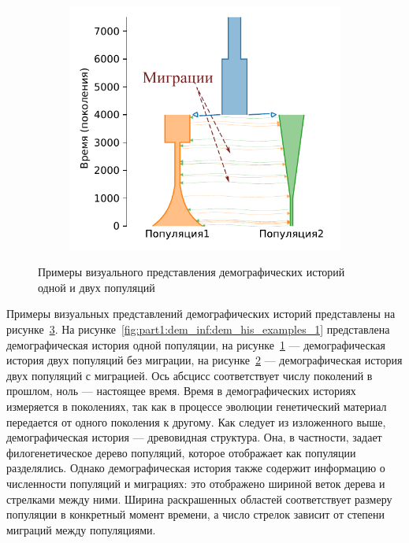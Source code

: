 \documentclass[a4paper,14pt,oneside,openany,article]{memoir}
\begin{document}
\begin{figure}[h]
\begin{subfigure}[b]{.33\textwidth}
    \caption{}
    \label{fig:part1:dem_inf:dem_his_examples_2}
    \end{subfigure}%
    \begin{subfigure}[b]{.33\textwidth}
    \includegraphics[width=\textwidth]{images/part1/dem_history/2d_model_migration_fixed.pdf}
    \caption{}
    \label{fig:part1:dem_inf:dem_his_examples_3}
    \end{subfigure}
    \caption{Примеры визуального представления демографических историй одной и двух популяций}
    \label{fig:part1:dem_inf:dem_his_examples}
\end{figure}

Примеры визуальных представлений демографических историй представлены на рисунке~\ref{fig:part1:dem_inf:dem_his_examples}. 
На рисунке~\ref{fig:part1:dem_inf:dem_his_examples_1} представлена демографическая история одной популяции, на рисунке~\ref{fig:part1:dem_inf:dem_his_examples_2}  --- демографическая история двух популяций без миграции, на рисунке~\ref{fig:part1:dem_inf:dem_his_examples_3} --- демографическая история двух популяций с миграцией.
Ось абсцисс соответствует числу поколений в прошлом, ноль --- настоящее время.
Время в демографических историях измеряется в поколениях, так как в процессе эволюции генетический материал передается от одного поколения к другому.
Как следует из изложенного выше, демографическая история --- древовидная структура.
Она, в частности, задает филогенетическое дерево популяций, которое отображает как популяции разделялись.
Однако демографическая история также содержит информацию о численности популяций и миграциях: это отображено шириной веток дерева и стрелками между ними.
Ширина раскрашенных областей соответствует размеру популяции в конкретный момент времени, а число стрелок зависит от степени миграций между популяциями.
\end{document}
